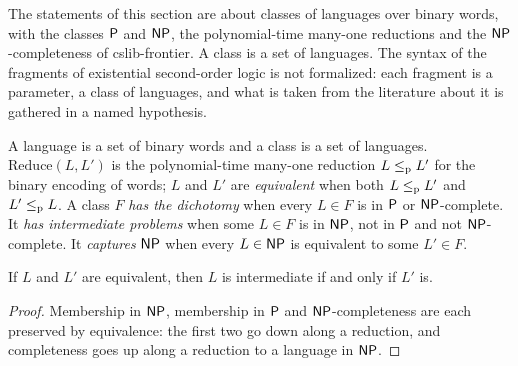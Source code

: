 The statements of this section are about classes of languages over binary words, with the classes
$\mathsf{P}$ and $\mathsf{NP}$, the polynomial-time many-one reductions and the $\mathsf{NP}$-completeness of
cslib-frontier. A class is a set of languages. The syntax of the fragments of existential
second-order logic is not formalized: each fragment is a parameter, a class of languages, and what is
taken from the literature about it is gathered in a named hypothesis.

\begin{definition}
  \label{def:structure-dicotomia-defs}
  \leanok
  A language is a set of binary words and a class is a set of languages. $\mathrm{Reduce}(L, L')$ is
  the polynomial-time many-one reduction $L \le_{\mathrm{p}} L'$ for the binary encoding of words;
  $L$ and $L'$ are \emph{equivalent} when both $L \le_{\mathrm{p}} L'$ and $L' \le_{\mathrm{p}} L$. A class $F$ \emph{has the
  dichotomy} when every $L \in F$ is in $\mathsf{P}$ or $\mathsf{NP}$-complete. It \emph{has intermediate problems}
  when some $L \in F$ is in $\mathsf{NP}$, not in $\mathsf{P}$ and not $\mathsf{NP}$-complete. It \emph{captures} $\mathsf{NP}$
  when every $L \in \mathsf{NP}$ is equivalent to some $L' \in F$.
  \own{}
\end{definition}

\begin{theorem}
  \label{thm:structure-intermedio-equiv}
  \leanok
  If $L$ and $L'$ are equivalent, then $L$ is intermediate if and only if $L'$ is.
  \own{}
\end{theorem}

\begin{proof}
  \leanok
  Membership in $\mathsf{NP}$, membership in $\mathsf{P}$ and $\mathsf{NP}$-completeness are each preserved by
  equivalence: the first two go down along a reduction, and completeness goes up along a reduction to
  a language in $\mathsf{NP}$.
\end{proof}

